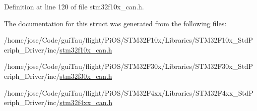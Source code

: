 Definition at line 120 of file stm32f10x\-\_\-can.\-h.



The documentation for this struct was generated from the following files\-:\begin{DoxyCompactItemize}
\item 
/home/jose/\-Code/gui\-Tau/flight/\-Pi\-O\-S/\-S\-T\-M32\-F10x/\-Libraries/\-S\-T\-M32\-F10x\-\_\-\-Std\-Periph\-\_\-\-Driver/inc/\hyperlink{stm32f10x__can_8h}{stm32f10x\-\_\-can.\-h}\item 
/home/jose/\-Code/gui\-Tau/flight/\-Pi\-O\-S/\-S\-T\-M32\-F30x/\-Libraries/\-S\-T\-M32\-F30x\-\_\-\-Std\-Periph\-\_\-\-Driver/inc/\hyperlink{stm32f30x__can_8h}{stm32f30x\-\_\-can.\-h}\item 
/home/jose/\-Code/gui\-Tau/flight/\-Pi\-O\-S/\-S\-T\-M32\-F4xx/\-Libraries/\-S\-T\-M32\-F4xx\-\_\-\-Std\-Periph\-\_\-\-Driver/inc/\hyperlink{stm32f4xx__can_8h}{stm32f4xx\-\_\-can.\-h}\end{DoxyCompactItemize}
